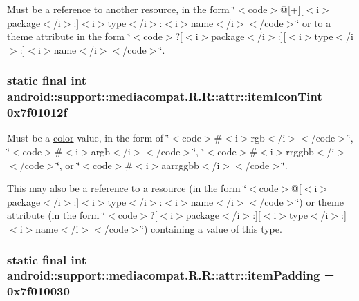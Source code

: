 Must be a reference to another resource, in the form \char`\"{}$<$code$>$@\mbox{[}+\mbox{]}\mbox{[}$<$i$>$package$<$/i$>$:\mbox{]}$<$i$>$type$<$/i$>$:$<$i$>$name$<$/i$>$$<$/code$>$\char`\"{} or to a theme attribute in the form \char`\"{}$<$code$>$?\mbox{[}$<$i$>$package$<$/i$>$:\mbox{]}\mbox{[}$<$i$>$type$<$/i$>$:\mbox{]}$<$i$>$name$<$/i$>$$<$/code$>$\char`\"{}. \hypertarget{classandroid_1_1support_1_1mediacompat_1_1_r_1_1attr_b0e8c5ac9b86a3064f1c6009e9257216}{
\subsubsection[{itemIconTint}]{\setlength{\rightskip}{0pt plus 5cm}static final int android::support::mediacompat.R.R::attr::itemIconTint = 0x7f01012f}}
\label{classandroid_1_1support_1_1mediacompat_1_1_r_1_1attr_b0e8c5ac9b86a3064f1c6009e9257216}


Must be a \hyperlink{classandroid_1_1support_1_1mediacompat_1_1_r_1_1color}{color} value, in the form of \char`\"{}$<$code$>$\#$<$i$>$rgb$<$/i$>$$<$/code$>$\char`\"{}, \char`\"{}$<$code$>$\#$<$i$>$argb$<$/i$>$$<$/code$>$\char`\"{}, \char`\"{}$<$code$>$\#$<$i$>$rrggbb$<$/i$>$$<$/code$>$\char`\"{}, or \char`\"{}$<$code$>$\#$<$i$>$aarrggbb$<$/i$>$$<$/code$>$\char`\"{}. 

This may also be a reference to a resource (in the form \char`\"{}$<$code$>$@\mbox{[}$<$i$>$package$<$/i$>$:\mbox{]}$<$i$>$type$<$/i$>$:$<$i$>$name$<$/i$>$$<$/code$>$\char`\"{}) or theme attribute (in the form \char`\"{}$<$code$>$?\mbox{[}$<$i$>$package$<$/i$>$:\mbox{]}\mbox{[}$<$i$>$type$<$/i$>$:\mbox{]}$<$i$>$name$<$/i$>$$<$/code$>$\char`\"{}) containing a value of this type. \hypertarget{classandroid_1_1support_1_1mediacompat_1_1_r_1_1attr_8b509a08e515b35bc10e4e5297d684dd}{
\subsubsection[{itemPadding}]{\setlength{\rightskip}{0pt plus 5cm}static final int android::support::mediacompat.R.R::attr::itemPadding = 0x7f010030}}
\label{classandroid_1_1support_1_1mediacompat_1_1_r_1_1attr_8b509a08e515b35bc10e4e5297d684dd}



